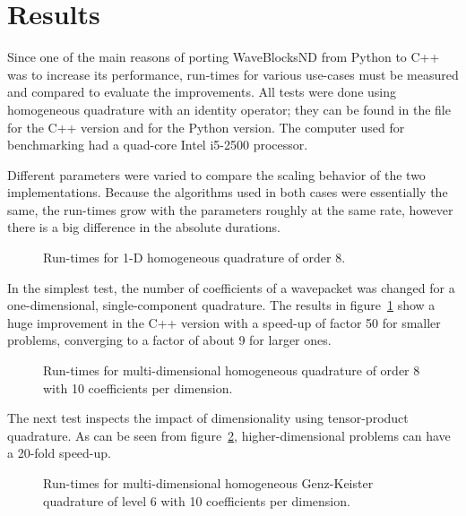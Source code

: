 \section{Results}
\label{sec:results}

Since one of the main reasons of porting WaveBlocksND from Python to C++ was to
increase its performance, run-times for various use-cases must be measured and
compared to evaluate the improvements.
All tests were done using homogeneous quadrature with an identity operator;
they can be found in the file  for the
C++ version and  for the Python version.
The computer used for benchmarking had a quad-core Intel i5-2500 processor.

Different parameters were varied to compare the scaling behavior of the two
implementations.
Because the algorithms used in both cases were essentially the same, the
run-times grow with the parameters roughly at the same rate, however there is a
big difference in the absolute durations.

\begin{figure}
  \center
  
  \caption{Run-times for 1-D homogeneous quadrature of order 8.}
  \label{fig:speedup1d}
\end{figure}

In the simplest test, the number of coefficients of a wavepacket was changed
for a one-dimensional, single-component quadrature.
The results in figure~\ref{fig:speedup1d} show a huge improvement in the C++
version with a speed-up of factor 50 for smaller problems, converging to a
factor of about 9 for larger ones.

\begin{figure}
  \center
  
  \caption{Run-times for multi-dimensional homogeneous quadrature of order 8
    with 10 coefficients per dimension.}
  \label{fig:speedupnd}
\end{figure}

The next test inspects the impact of dimensionality using tensor-product
quadrature.
As can be seen from figure~\ref{fig:speedupnd}, higher-dimensional problems can
have a 20-fold speed-up.

\begin{figure}
  \center
  
  \caption{Run-times for multi-dimensional homogeneous Genz-Keister quadrature
    of level 6 with 10 coefficients per dimension.}
  \label{fig:speedupgenzkeister}
\end{figure}

